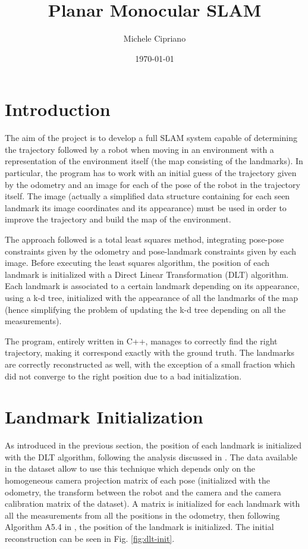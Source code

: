 \documentclass[11pt]{extarticle}
\title{Planar Monocular SLAM}
\author{Michele Cipriano}
\date{\today}
\begin{document}
\maketitle

\section{Introduction}
The aim of the project is to develop a full SLAM system capable of determining
the trajectory followed by a robot when moving in an environment with a
representation of the environment itself (the map consisting of the landmarks).
In particular, the program has to work with an initial guess of the trajectory
given by the odometry and an image for each of the pose of the robot in the
trajectory itself. The image (actually a simplified data structure
containing for each seen landmark its image coordinates and its appearance)
must be used in order to improve the trajectory and build the map of the
environment.

The approach followed is a total least squares method, integrating pose-pose
constraints given by the odometry and pose-landmark constraints given by
each image. Before executing the least squares algorithm, the position of each
landmark is initialized with a Direct Linear Transformation (DLT) algorithm.
Each landmark is associated to a certain landmark depending on its appearance,
using a k-d tree, initialized with the appearance of all the landmarks of the
map (hence simplifying the problem of updating the k-d tree depending on
all the measurements).

The program, entirely written in C++, manages to correctly find the right
trajectory, making it correspond exactly with the ground truth. The
landmarks are correctly reconstructed as well, with the exception of
a small fraction which did not converge to the right position due to a bad
initialization.

\section{Landmark Initialization}
As introduced in the previous section, the position of each landmark is
initialized with the DLT algorithm, following the analysis discussed in
\cite{Hartley2004}. The data available in the dataset allow to use this
technique which depends only on the homogeneous camera projection matrix of
each pose (initialized with the odometry, the transform between the robot
and the camera and the camera calibration matrix of the dataset). A matrix
is initialized for each landmark with all the measurements from all the
positions in the odometry, then following Algorithm A5.4 in \cite{Hartley2004},
the position of the landmark is initialized. The initial reconstruction
can be seen in Fig. \ref{fig:dlt-init}.
\end{document}

